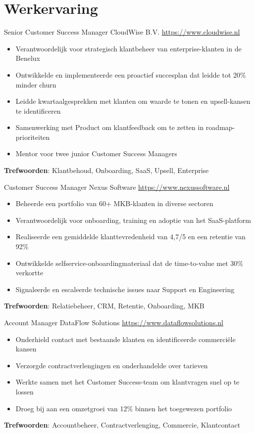 \documentclass[a4paper, serif, 10pt]{moderncv}
\begin{document}
\section{Werkervaring}

        {Senior Customer Success Manager}
        {CloudWise B.V.}
        {\url{https://www.cloudwise.nl}}
        {}
        {\begin{itemize}
\item Verantwoordelijk voor strategisch klantbeheer van enterprise-klanten in de Benelux
\item Ontwikkelde en implementeerde een proactief succesplan dat leidde tot 20\% minder churn
\item Leidde kwartaalgesprekken met klanten om waarde te tonen en upsell-kansen te identificeren
\item Samenwerking met Product om klantfeedback om te zetten in roadmap-prioriteiten
\item Mentor voor twee junior Customer Success Managers
\end{itemize}
\textbf{Trefwoorden}: Klantbehoud, Onboarding, SaaS, Upsell, Enterprise}

        {Customer Success Manager}
        {Nexus Software}
        {\url{https://www.nexussoftware.nl}}
        {}
        {\begin{itemize}
\item Beheerde een portfolio van 60+ MKB-klanten in diverse sectoren
\item Verantwoordelijk voor onboarding, training en adoptie van het SaaS-platform
\item Realiseerde een gemiddelde klanttevredenheid van 4,7/5 en een retentie van 92\%
\item Ontwikkelde selfservice-onboardingmateriaal dat de time-to-value met 30\% verkortte
\item Signaleerde en escaleerde technische issues naar Support en Engineering
\end{itemize}
\textbf{Trefwoorden}: Relatiebeheer, CRM, Retentie, Onboarding, MKB}

        {Account Manager}
        {DataFlow Solutions}
        {\url{https://www.dataflowsolutions.nl}}
        {}
        {\begin{itemize}
\item Onderhield contact met bestaande klanten en identificeerde commerciële kansen
\item Verzorgde contractverlengingen en onderhandelde over tarieven
\item Werkte samen met het Customer Success-team om klantvragen snel op te lossen
\item Droeg bij aan een omzetgroei van 12\% binnen het toegewezen portfolio
\end{itemize}
\textbf{Trefwoorden}: Accountbeheer, Contractverlenging, Commercie, Klantcontact}
\end{document}
